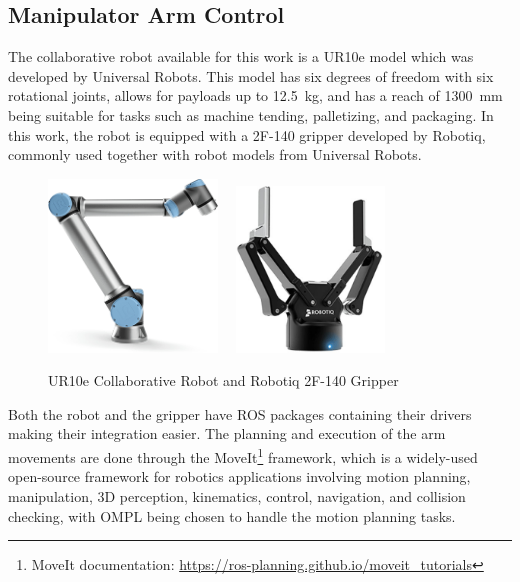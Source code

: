 \subsection{Manipulator Arm Control}
\label{subsection:manipulator_arm_control}

The collaborative robot available for this work is a UR10e model which was developed by Universal Robots. This model has six degrees of freedom with six rotational joints, allows for payloads up to \SI{12.5}{\kilogram}, and has a reach of \SI{1300}{\milli\metre} being suitable for tasks such as machine tending, palletizing, and packaging\cite{UR10e}. In this work, the robot is equipped with a 2F-140 gripper developed by Robotiq, commonly used together with robot models from Universal Robots\cite{robotiq_gripper}.

\begin{figure}[ht]
    \centerline{\includegraphics[width=0.4\textwidth]{figs/UR10e.jpg} \ \ \includegraphics[width=0.35\textwidth]{figs/robotiq-2f-140.jpg}}
    \caption[UR10e Collaborative Robot and Robotiq 2F-140 Gripper]{UR10e Collaborative Robot \cite{UR10e_image} and Robotiq 2F-140 Gripper \cite{robotiq_gripper}}
    \label{fig:ur10e}
\end{figure}

Both the robot and the gripper have ROS packages containing their drivers making their integration easier. The planning and execution of the arm movements are done through the MoveIt\footnote{MoveIt documentation: \url{https://ros-planning.github.io/moveit_tutorials}} framework, which is a widely-used open-source framework for robotics applications involving motion planning, manipulation, 3D perception, kinematics, control, navigation, and collision checking, with OMPL being chosen to handle the motion planning tasks.

